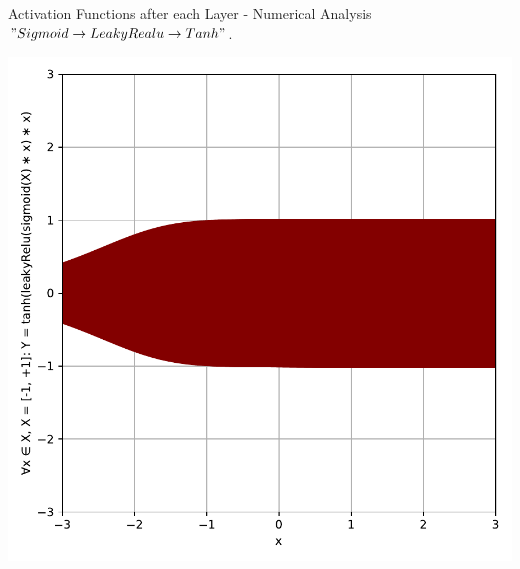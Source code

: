 \documentclass{beamer}
\begin{document}
		\begin{frame}{Activation Functions after each Layer - Numerical Analysis}
			$" Sigmoid \rightarrow LeakyRealu \rightarrow Tanh "$.
			\begin{center}
				\includegraphics[height=0.9\textheight]{sigmoid_leakyRelu_tanh}
			\end{center}
		\end{frame}
\end{document}
